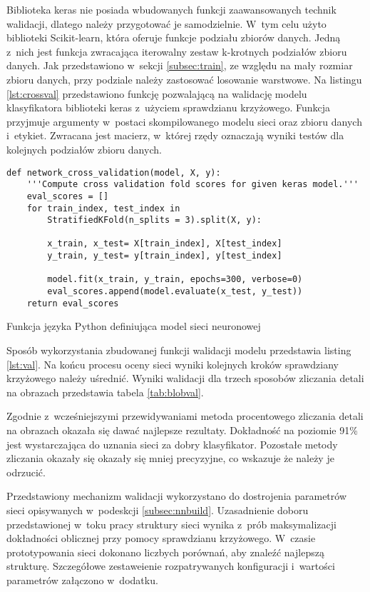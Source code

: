 Biblioteka keras nie posiada wbudowanych funkcji zaawansowanych technik
walidacji, dlatego należy przygotować je samodzielnie.
W~tym celu użyto biblioteki Scikit-learn, która oferuje funkcje podziału
zbiorów danych.
Jedną z~nich jest funkcja zwracająca iterowalny zestaw k-krotnych
podziałów zbioru danych.
Jak przedstawiono w~sekcji \ref{subsec:train}, ze względu na mały rozmiar
zbioru danych, przy podziale należy zastosować losowanie warstwowe.
Na listingu \ref{lst:crossval} przedstawiono funkcję pozwalającą na walidację
modelu klasyfikatora biblioteki keras z~użyciem sprawdzianu krzyżowego.
Funkcja przyjmuje argumenty w~postaci skompilowanego modelu sieci oraz
zbioru danych i~etykiet.
Zwracana jest macierz, w~której rzędy oznaczają wyniki testów dla kolejnych
podziałów zbioru danych.
\begin{listing}[htbp]
\begin{verbatim}
def network_cross_validation(model, X, y):
    '''Compute cross validation fold scores for given keras model.'''
    eval_scores = []
    for train_index, test_index in 
        StratifiedKFold(n_splits = 3).split(X, y):
        
        x_train, x_test= X[train_index], X[test_index]
        y_train, y_test= y[train_index], y[test_index]
        
        model.fit(x_train, y_train, epochs=300, verbose=0)
        eval_scores.append(model.evaluate(x_test, y_test))
    return eval_scores
\end{verbatim}
\caption{Funkcja języka Python definiująca model sieci neuronowej}
\label{lst:crossval}
\end{listing}
Sposób wykorzystania zbudowanej funkcji walidacji modelu przedstawia
listing \ref{lst:val}.
Na końcu procesu oceny sieci wyniki kolejnych kroków sprawdziany krzyżowego
należy uśrednić.
Wyniki walidacji dla trzech sposobów zliczania detali na obrazach przedstawia
tabela \ref{tab:blobval}.

Zgodnie z~wcześniejszymi przewidywaniami metoda procentowego zliczania
detali na obrazach okazała się dawać najlepsze rezultaty.
Dokładność na poziomie 91\% jest wystarczająca do uznania sieci za
dobry klasyfikator.
Pozostałe metody zliczania okazały się okazały się mniej precyzyjne, co
wskazuje że należy je odrzucić.

Przedstawiony mechanizm walidacji wykorzystano do dostrojenia parametrów
sieci opisywanych w~podeskcji \ref{subsec:nnbuild}.
Uzasadnienie doboru przedstawionej w~toku pracy struktury sieci wynika z~prób
maksymalizacji dokładności oblicznej przy pomocy sprawdzianu krzyżowego.
W~czasie prototypowania sieci dokonano liczbych porównań, aby znaleźć
najlepszą strukturę.
Szczegółowe zestaweienie rozpatrywanych konfiguracji i~wartości parametrów
załączono w~dodatku.


